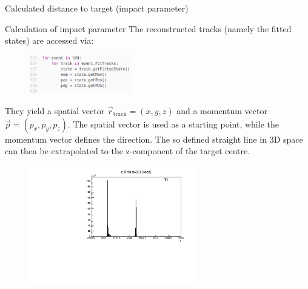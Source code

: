 \begin{frame}[t]
  \vspace*{\fill}
    \centering
    {\huge Calculated distance to target (impact parameter)}
  \vspace*{\fill}
\end{frame}


\begin{frame}[t]{Calculation of impact parameter}
    The reconstructed tracks (namely the fitted states) are accessed via:
    \begin{figure}
      \includegraphics[width=0.4\textwidth,left]{fig/loop.png}
    \end{figure}
    They yield a spatial vector $\vec{r}_\text{track}=(x,y,z)$ and a momentum vector $\vec{p}=(p_x,p_y,p_z)$. The spatial vector is used as a starting point, while the momentum vector defines the direction. The so defined straight line in 3D space can then be extrapolated to the z-component of the target centre.
\end{frame}

\begin{frame}[t]{}
  \begin{figure}
    \centering
    \includegraphics[width=0.65\textwidth]{../hists/nofield/z_1M.pdf}
  \end{figure}
\end{frame}

